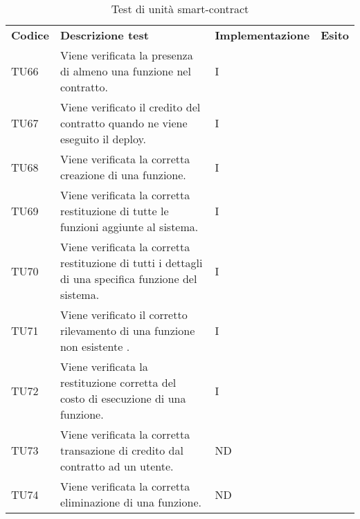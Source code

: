 \renewcommand{\arraystretch}{1.5}
\begin{longtable}{|C{1.5cm}|C{8cm}|C{3cm}|C{1cm}|}

	\caption{Test di unità smart-contract}\\
	\hline

	\textbf{Codice} & \textbf{Descrizione test}  &\textbf{Implementazione}& \textbf{Esito}
	\tabularnewline
	\endfirsthead

	TU66 &
	Viene verificata la presenza di almeno una funzione nel contratto.  &
	I \\

	TU67 &
	Viene verificato il credito del contratto quando ne viene eseguito il deploy.  &
	I \\

	TU68 &
	Viene verificata la corretta creazione di una funzione.  &
	I \\

	TU69 &
	Viene verificata la corretta restituzione di tutte le funzioni aggiunte al sistema.  &
	I \\

	TU70 &
	Viene verificata la corretta restituzione di tutti i dettagli di una specifica funzione del sistema.  &
	I \\

	TU71 &
	Viene verificato il corretto rilevamento di una funzione non esistente .  &
	I \\


	TU72 &
	Viene verificata la restituzione corretta del costo  di esecuzione di una funzione.  &
	I \\



	TU73 &
	Viene verificata la corretta transazione di credito dal contratto ad un utente.  &
	ND \\

	TU74 &
	Viene verificata la corretta eliminazione di una funzione.  &
	ND \\


\end{longtable}

